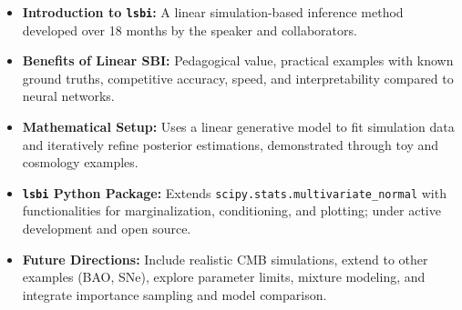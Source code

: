 \documentclass[aspectratio=169]{beamer}
\begin{document}
\begin{frame}
\begin{itemize}
        \item \textbf{Introduction to \texttt{lsbi}:} A linear simulation-based inference method developed over 18 months by the speaker and collaborators.
        \item \textbf{Benefits of Linear SBI:} Pedagogical value, practical examples with known ground truths, competitive accuracy, speed, and interpretability compared to neural networks.
        \item \textbf{Mathematical Setup:} Uses a linear generative model to fit simulation data and iteratively refine posterior estimations, demonstrated through toy and cosmology examples.
        \item \textbf{\texttt{lsbi} Python Package:} Extends \texttt{scipy.stats.multivariate\_normal} with functionalities for marginalization, conditioning, and plotting; under active development and open source.
        \item \textbf{Future Directions:} Include realistic CMB simulations, extend to other examples (BAO, SNe), explore parameter limits, mixture modeling, and integrate importance sampling and model comparison.
    \end{itemize}
\end{frame}
\end{document}
